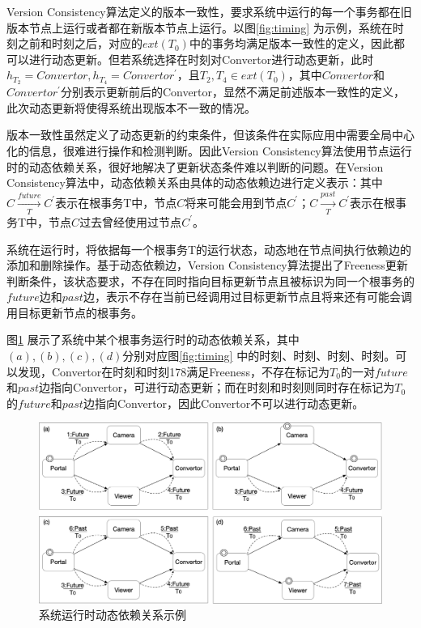 \documentclass[macfonts,master]{njuthesis}
\begin{document}
Version Consistency算法定义的版本一致性，要求系统中运行的每一个事务都在旧版本节点上运行或者都在新版本节点上运行。以图\ref{fig:timing} 为示例，系统在时刻之前和时刻之后，对应的$ext (T_0) $中的事务均满足版本一致性的定义，因此都可以进行动态更新。但若系统选择在时刻对Convertor进行动态更新，此时$h_{T_2} = Convertor,h_{T_4} = Convertor^{'}$，且$T_2,T_4 \in ext (T_0) $，其中$Convertor$和$Convertor^{'}$分别表示更新前后的Convertor，显然不满足前述版本一致性的定义，此次动态更新将使得系统出现版本不一致的情况。

版本一致性虽然定义了动态更新的约束条件，但该条件在实际应用中需要全局中心化的信息，很难进行操作和检测判断。因此Version Consistency算法使用节点运行时的动态依赖关系，很好地解决了更新状态条件难以判断的问题。在Version Consistency算法中，动态依赖关系由具体的动态依赖边进行定义表示：其中$C\xrightarrow[T]{future} C^{'}$表示在根事务T中，节点$C$将来可能会用到节点$C^{'}$；$C\xrightarrow[T]{past} C^{'}$表示在根事务T中，节点$C$过去曾经使用过节点$C^{'}$。

系统在运行时，将依据每一个根事务T的运行状态，动态地在节点间执行依赖边的添加和删除操作。基于动态依赖边，Version Consistency算法提出了Freeness更新判断条件，该状态要求，不存在同时指向目标更新节点且被标识为同一个根事务的$future$边和$past$边，表示不存在当前已经调用过目标更新节点且将来还有可能会调用目标更新节点的根事务。

图\ref{fig:dyn_dep} 展示了系统中某个根事务运行时的动态依赖关系，其中$ (a) , (b) , (c) , (d) $分别对应图\ref{fig:timing} 中的时刻、时刻、时刻、时刻。可以发现，Convertor在时刻和时刻{178}满足Freeness，不存在标记为$T_0$的一对$future$和$past$边指向Convertor，可进行动态更新；而在时刻和时刻则同时存在标记为$T_0$的$future$和$past$边指向Convertor，因此Convertor不可以进行动态更新。

\begin{figure}[!htbp]
  \centering
  \includegraphics[width= 1.0\textwidth]{image/dyn_dep.png}
  \caption{系统运行时动态依赖关系示例}
  \label{fig:dyn_dep}
\end{figure}
\end{document}
